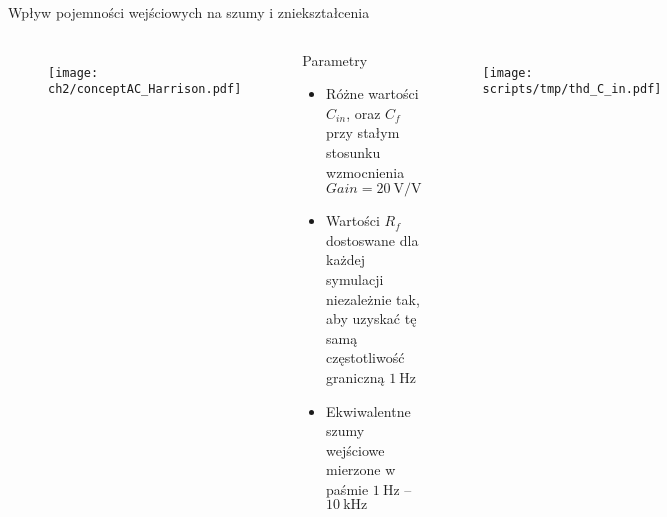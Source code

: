 





\begin{frame}{Wpływ pojemności wejściowych na szumy i zniekształcenia}
    \begin{columns}
        \vspace{-1em}

        \begin{figure}[H]
            \centering
            \texttt{[image: ch2/conceptAC\_Harrison.pdf]} 
        \end{figure}
\vspace{-2em}

        \begin{block}{Parametry}
            \begin{itemize}
                \item Różne wartości $C_{in}$, oraz $C_{f}$ przy stałym stosunku wzmocnienia $Gain = \SI{20}{\volt\per\volt}$
                \item Wartości $R_{f}$ dostoswane dla każdej symulacji niezależnie tak, aby uzyskać tę samą częstotliwość graniczną $\SI{1}{\hertz}$
                \item Ekwiwalentne szumy wejściowe mierzone w paśmie $\SI{1}{\hertz}$ -- $\SI{10}{\kilo\hertz}$
            \end{itemize}
                \end{block}


    \begin{figure}[H]
        \centering
        \texttt{[image: scripts/tmp/thd\_C\_in.pdf]} 
    \end{figure}
\end{columns}

\end{frame}
